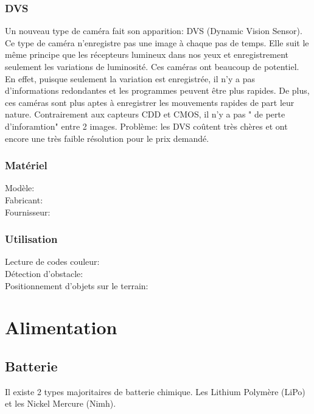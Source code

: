 \documentclass[a4paper, 11pt]{report}
\begin{document}
\subsection{DVS}
Un nouveau type de caméra fait son apparition: DVS (Dynamic Vision Sensor). Ce type de caméra n'enregistre pas une image à chaque pas de temps. Elle suit le même principe que les récepteurs lumineux dans nos yeux et enregistrement seulement les variations de luminosité. Ces caméras ont beaucoup de potentiel. En effet, puisque seulement la variation est enregistrée, il n'y a pas d'informations redondantes et les programmes peuvent être plus rapides. De plus, ces caméras sont plus aptes à enregistrer les mouvements rapides de part leur nature. Contrairement aux capteurs CDD et CMOS, il n'y a pas " de perte d'inforamtion" entre 2 images. Problème: les DVS coûtent très chères et ont encore une très faible résolution pour le prix demandé.

\subsection{Matériel}
\begin{description}
\item[Modèle:]
\item[Fabricant:]
\item[Fournisseur:]
\end{description}


\subsection{Utilisation}
\begin{description}
\item[Lecture de codes couleur:]
\item[Détection d'obstacle:]
\item[Positionnement d'objets sur le terrain:]
\end{description}

\chapter{Alimentation}

\section{Batterie}
Il existe 2 types majoritaires de batterie chimique. Les Lithium Polymère (LiPo) et les Nickel Mercure (Nimh).
\end{document}
